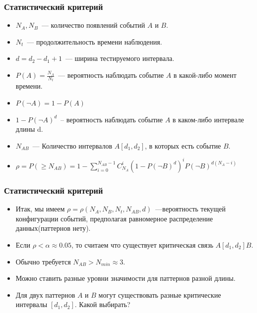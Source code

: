 \documentclass[smaller]{beamer}
\begin{document}
\begin{frame}	
  \frametitle{Статистический критерий}
\begin{itemize}
 \item $N_A, N_B$~--- количество появлений событий $A$ и $B$.

  \item $N_t$~--- продолжительность времени наблюдения.

  \item $d=d_2-d_1+1$~--- ширина тестируемого интервала.

  \item $P(A)=\frac{N_A}{N_t}$~--- вероятность наблюдать событие $A$ в какой-либо момент времени. 
  
  \item $P(\neg A) = 1 - P(A)$ 
  
  \item $1-P(\neg A)^d$~-- вероятность наблюдать событие $A$ в каком-либо интервале длины d.

  \item $N_{AB}$~--- Количество интервалов $A[d_1, d_2]$, в которых есть событие $B$.

  \item $\rho = P(\geqslant N_{AB}) = 1 - \sum_{i=0}^{N_{AB}-1}C_{N_{A}}^i( 1-P(\neg B)^d )^iP(\neg B)^{d(N_{A}-i)}$
\end{itemize}
\end{frame}

\begin{frame}	
  \frametitle{Статистический критерий}
\begin{itemize}
 \item Итак, мы имеем $\rho=\rho(N_A,N_B,N_t,N_{AB},d)$~---вероятность текущей конфигурации
событий, предполагая равномерное распределение данных(паттернов нету).
  \item Если $\rho<\alpha\approx0.05$, то считаем что существует критическая связь $A[d_1,d_2]B$.
  \item Обычно требуется $N_{AB}>N_{min}\approx3$.
  \item Можно ставить разные уровни значимости для паттернов разной длины.
  \item Для двух паттернов $A$ и $B$ могут существовать разные критические интервалы $[d_1, d_2]$.
      Какой выбирать?
\end{itemize}
\end{frame}
\end{document}
